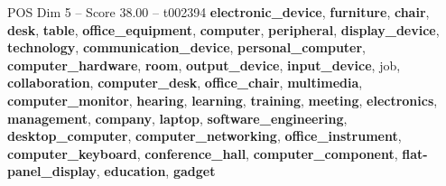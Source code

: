 \begin{textsample}{POS Dim 5 – Score 38.00 – t002394}  \label{ex:f5_pos_005}
\textbf{electronic\_device}, \textbf{furniture}, \textbf{chair}, \textbf{desk}, \textbf{table}, \textbf{office\_equipment}, \textbf{computer}, \textbf{peripheral}, \textbf{display\_device}, \textbf{technology}, \textbf{communication\_device}, \textbf{personal\_computer}, \textbf{computer\_hardware}, \textbf{room}, \textbf{output\_device}, \textbf{input\_device}, job, \textbf{collaboration}, \textbf{computer\_desk}, \textbf{office\_chair}, \textbf{multimedia}, \textbf{computer\_monitor}, \textbf{hearing}, \textbf{learning}, \textbf{training}, \textbf{meeting}, \textbf{electronics}, \textbf{management}, \textbf{company}, \textbf{laptop}, \textbf{software\_engineering}, \textbf{desktop\_computer}, \textbf{computer\_networking}, \textbf{office\_instrument}, \textbf{computer\_keyboard}, \textbf{conference\_hall}, \textbf{computer\_component}, \textbf{flat-panel\_display}, \textbf{education}, \textbf{gadget}

\end{textsample}
